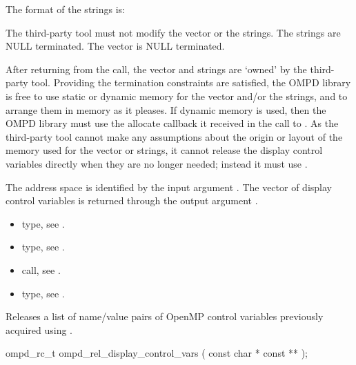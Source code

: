 The format of the strings is:
\begin{center}
\end{center}

The third-party tool must not modify the vector or the strings.
The strings are NULL terminated.
The vector is NULL terminated.

After returning from the call, the vector and strings are `owned'
by the third-party tool.
Providing the termination constraints are satisfied, the OMPD library
is free to use static or dynamic memory for the
vector and/or the strings, and to arrange them in memory
as it pleases.
If dynamic memory is used, then the OMPD library must use
the allocate callback it received in the call to .
As the third-party tool cannot make any assumptions about the origin or
layout of the memory used for the vector or strings, it cannot release
the display control variables directly when they are no longer
needed; instead it must use .

\argdesc
The address space is identified by the input argument .
The vector of display control variables is returned through
the output argument .

\crossreferences
\begin{itemize}
	\item {} type, see 
	.
	\item {} type, see .
	\item {} call, see .
	\item {} type, see 
	.
\end{itemize}


\label{subsubsubsec:ompd_rel_display_control_vars}
\summary

Releases a list of name/value pairs of OpenMP control variables
previously acquired using .
\format
\begin{cspecific}
\begin{ompSyntax}
ompd_rc_t ompd_rel_display_control_vars (
  const char * const **
);
\end{ompSyntax}
\end{cspecific}

